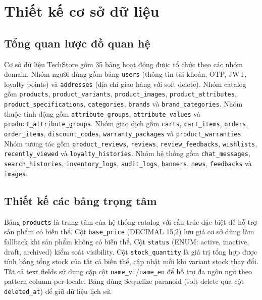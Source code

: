 \section{Thiết kế cơ sở dữ liệu}

\subsection{Tổng quan lược đồ quan hệ}

Cơ sở dữ liệu TechStore gồm 35 bảng hoạt động được tổ chức theo các nhóm domain. Nhóm người dùng gồm bảng \texttt{users} (thông tin tài khoản, OTP, JWT, loyalty points) và \texttt{addresses} (địa chỉ giao hàng với soft delete). Nhóm catalog gồm \texttt{products}, \texttt{product\_variants}, \texttt{product\_images}, \texttt{product\_attributes}, \texttt{product\_specifications}, \texttt{categories}, \texttt{brands} và \texttt{brand\_categories}. Nhóm thuộc tính động gồm \texttt{attribute\_groups}, \texttt{attribute\_values} và \texttt{product\_attribute\_groups}. Nhóm giao dịch gồm \texttt{carts}, \texttt{cart\_items}, \texttt{orders}, \texttt{order\_items}, \texttt{discount\_codes}, \texttt{warranty\_packages} và \texttt{product\_warranties}. Nhóm tương tác gồm \texttt{product\_reviews}, \texttt{reviews}, \texttt{review\_feedbacks}, \texttt{wishlists}, \texttt{recently\_viewed} và \texttt{loyalty\_histories}. Nhóm hệ thống gồm \texttt{chat\_messages}, \texttt{search\_histories}, \texttt{inventory\_logs}, \texttt{audit\_logs}, \texttt{banners}, \texttt{news}, \texttt{feedbacks} và \texttt{images}.

\subsection{Thiết kế các bảng trọng tâm}

Bảng \texttt{products} là trung tâm của hệ thống catalog với cấu trúc đặc biệt để hỗ trợ sản phẩm có biến thể. Cột \texttt{base\_price} (DECIMAL 15,2) lưu giá cơ sở dùng làm fallback khi sản phẩm không có biến thể. Cột \texttt{status} (ENUM: active, inactive, draft, archived) kiểm soát visibility. Cột \texttt{stock\_quantity} là giá trị tổng hợp được tính bằng tổng stock của tất cả biến thể, cập nhật mỗi khi variant stock thay đổi. Tất cả text fields sử dụng cặp cột \texttt{name\_vi}/\texttt{name\_en} để hỗ trợ đa ngôn ngữ theo pattern column-per-locale. Bảng dùng Sequelize paranoid (soft delete qua cột \texttt{deleted\_at}) để giữ dữ liệu lịch sử.

